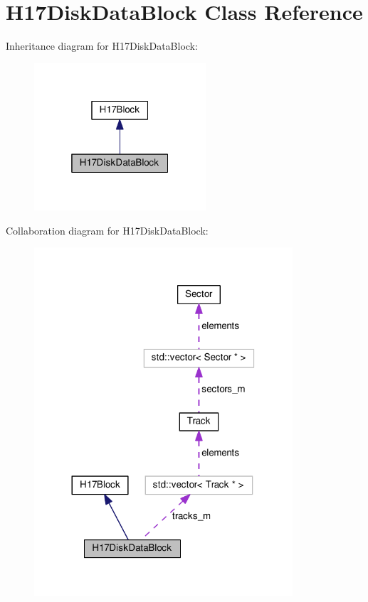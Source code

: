 \hypertarget{classH17DiskDataBlock}{}\section{H17\+Disk\+Data\+Block Class Reference}
\label{classH17DiskDataBlock}


Inheritance diagram for H17\+Disk\+Data\+Block\+:
\nopagebreak
\begin{figure}[H]
\begin{center}
\leavevmode
\includegraphics[width=181pt]{classH17DiskDataBlock__inherit__graph}
\end{center}
\end{figure}


Collaboration diagram for H17\+Disk\+Data\+Block\+:
\nopagebreak
\begin{figure}[H]
\begin{center}
\leavevmode
\includegraphics[width=272pt]{classH17DiskDataBlock__coll__graph}
\end{center}
\end{figure}
